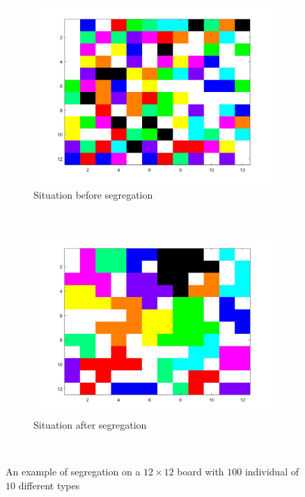 \vspace{-10pt}
\begin{figure}[H]
	\centering
    \begin{subfigure}{0.45\textwidth}
        \includegraphics[width=\textwidth]{vb2beginbord.jpg}
        \caption{Situation before segregation}
        \label{fig:example big board begin}
    \end{subfigure}\hspace{0cm}
    ~ 
    \begin{subfigure}{0.45\textwidth}
        \includegraphics[width=\textwidth]{vb2eindbord.jpg}
        \caption{Situation after segregation}
        \label{fig:example big board end}
    \end{subfigure}
    ~ 
    \caption{An example of segregation on a $12\times 12$ board with $100$ individual of $10$ different types}
    \label{fig:example big board}
\end{figure}
\vspace{-10pt}

